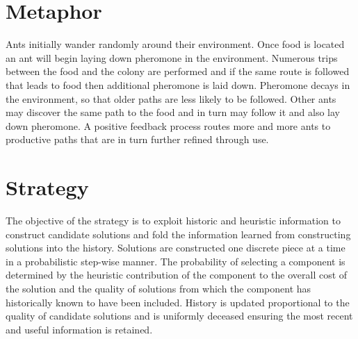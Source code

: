 \documentclass[a4paper, 11pt]{article}
\begin{document}
\section{Metaphor}
\label{sec:metaphor}
Ants initially wander randomly around their environment. Once food is located an ant will begin laying down pheromone in the environment. Numerous trips between the food and the colony are performed and if the same route is followed that leads to food then additional pheromone is laid down. Pheromone decays in the environment, so that older paths are less likely to be followed. Other ants may discover the same path to the food and in turn may follow it and also lay down pheromone. A positive feedback process routes more and more ants to productive paths that are in turn further refined through use.

\section{Strategy}
\label{sec:strategy}
The objective of the strategy is to exploit historic and heuristic information to construct candidate solutions and fold the information learned from constructing solutions into the history.
Solutions are constructed one discrete piece at a time in a probabilistic step-wise manner. The probability of selecting a component is determined by the heuristic contribution of the component to the overall cost of the solution and the quality of solutions from which the component has historically known to have been included. History is updated proportional to the quality of candidate solutions and is uniformly deceased ensuring the most recent and useful information is retained.

\end{document}
